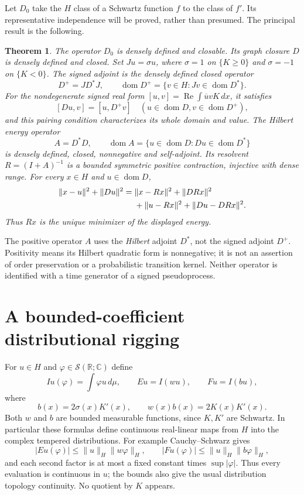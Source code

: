 \documentclass[11pt]{article}
\newtheorem{theorem}{Theorem}[section]
\newcommand{\R}{\mathbb R}\newcommand{\C}{\mathbb C}
\newcommand{\dom}{\operatorname{dom}}\newcommand{\ran}{\operatorname{ran}}
\newcommand{\Sc}{\mathcal S}\newcommand{\ip}[2]{\langle #1,#2\rangle}
\begin{document}
Let $D_0$ take the $H$ class of a Schwartz function $f$ to the
class of $f'$. Its representative independence will be proved,
rather than presumed. The principal result is the following.
\begin{theorem}\label{thm:main}
The operator $D_0$ is densely defined and closable. Its graph
closure $D$ is densely defined and closed. Set $J u=\sigma u$,
where $\sigma=1$ on $\{K\geq0\}$ and $\sigma=-1$ on $\{K<0\}$.
The signed adjoint is the densely defined closed operator
\[
 D^+=JD^*J,\qquad
 \dom D^+=\{v\in H:Jv\in\dom D^*\}.
\]
For the nondegenerate signed real form
$[u,v]=\operatorname{Re}\int\overline u vK\,dx$, it satisfies
\[
 [Du,v]=[u,D^+v]\quad(u\in\dom D, v\in\dom D^+),
\]
and this pairing condition characterizes its whole domain and value.
The Hilbert energy operator
\[
 A=D^*D,\qquad \dom A=\{u\in\dom D:Du\in\dom D^*\}
\]
is densely defined, closed, nonnegative and self-adjoint. Its
resolvent $R=(I+A)^{-1}$ is a bounded symmetric positive contraction,
injective with dense range. For every $x\in H$ and $u\in\dom D$,
\begin{align}\label{eq:gap}
 \|x-u\|^2+\|Du\|^2
 ={}&\|x-Rx\|^2+\|DRx\|^2\notag\\
 &+\|u-Rx\|^2+\|Du-DRx\|^2.
\end{align}
Thus $Rx$ is the unique minimizer of the displayed energy.
\end{theorem}
The positive operator $A$ uses the \emph{Hilbert} adjoint $D^*$,
not the signed adjoint $D^+$. Positivity means its Hilbert quadratic
form is nonnegative; it is not an assertion of order preservation
or a probabilistic transition kernel. Neither operator is identified
with a time generator of a signed pseudoprocess.

\section{A bounded-coefficient distributional rigging}
For $u\in H$ and $\varphi\in\Sc(\R;\C)$ define
\[
 Iu(\varphi)=\int\varphi u\,d\mu,\qquad
 Eu=I(wu),\qquad Fu=I(bu),
\]
where
\begin{equation}\label{eq:boundeddrift}
 b(x)=2\sigma(x)K'(x),\qquad w(x)b(x)=2K(x)K'(x).
\end{equation}
Both $w$ and $b$ are bounded measurable functions, since $K,K'$
are Schwartz. In particular these formulas define continuous
real-linear maps from $H$ into the complex tempered distributions.
For example Cauchy--Schwarz gives
\[
 |Eu(\varphi)|\leq\|u\|_H\|w\varphi\|_H,
 \qquad |Fu(\varphi)|\leq\|u\|_H\|b\varphi\|_H,
\]
and each second factor is at most a fixed constant times
$\sup|\varphi|$. Thus every evaluation is continuous in $u$;
the bounds also give the usual distribution topology continuity.
No quotient by $K$ appears.
\end{document}
